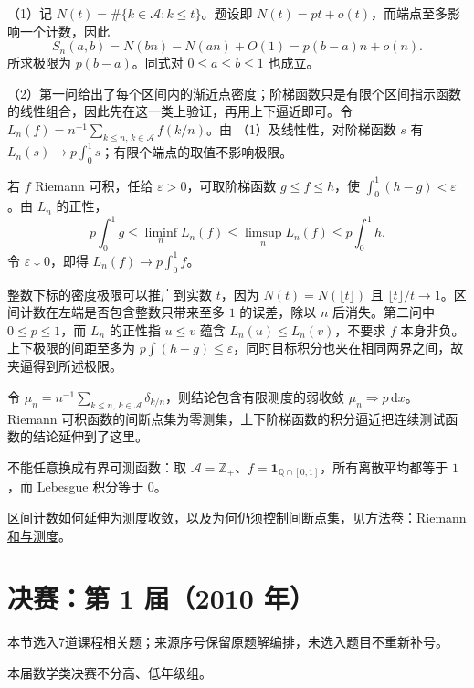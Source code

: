 \documentclass[12pt,fontset=fandol]{ctexart}
\begin{document}
\begin{solve}\label{ans:ch01-17th-A:6}

（1）记 $N(t)=\#\{k\in\mathcal A:k\leq t\}$。题设即 $N(t)=pt+o(t)$，而端点至多影响一个计数，因此
\[
S_n(a,b)=N(bn)-N(an)+O(1)=p(b-a)n+o(n).
\]
所求极限为 $p(b-a)$。同式对 $0\leq a\leq b\leq1$ 也成立。

（2）第一问给出了每个区间内的渐近点密度；阶梯函数只是有限个区间指示函数的线性组合，因此先在这一类上验证，再用上下逼近即可。令 $L_n(f)=n^{-1}\sum_{k\leq n,\,k\in\mathcal A}f(k/n)$。由 （1）及线性性，对阶梯函数 $s$ 有 $L_n(s)\to p\int_0^1s$；有限个端点的取值不影响极限。

若 $f$ Riemann 可积，任给 $\varepsilon>0$，可取阶梯函数 $g\leq f\leq h$，使 $\int_0^1(h-g)<\varepsilon$。由 $L_n$ 的正性，
\[
p\int_0^1g\leq\liminf_nL_n(f)
\leq\limsup_nL_n(f)\leq p\int_0^1h.
\]
令 $\varepsilon\downarrow0$，即得 $L_n(f)\to p\int_0^1f$。

整数下标的密度极限可以推广到实数 $t$，因为 $N(t)=N(\lfloor t\rfloor)$ 且 $\lfloor t\rfloor/t\to1$。区间计数在左端是否包含整数只带来至多 $1$ 的误差，除以 $n$ 后消失。第二问中 $0\le p\le1$，而 $L_n$ 的正性指 $u\le v$ 蕴含 $L_n(u)\le L_n(v)$，不要求 $f$ 本身非负。上下极限的间距至多为 $p\int(h-g)\le\varepsilon$，同时目标积分也夹在相同两界之间，故夹逼得到所述极限。

\end{solve}

\begin{remark}[方法与条件]令 $\mu_n=n^{-1}\sum_{k\leq n,\,k\in\mathcal A}\delta_{k/n}$，则结论包含有限测度的弱收敛 $\mu_n\Rightarrow p\,\mathrm dx$。Riemann 可积函数的间断点集为零测集，上下阶梯函数的积分逼近把连续测试函数的结论延伸到了这里。

不能任意换成有界可测函数：取 $\mathcal A=\mathbb Z_+$、$f=\mathbf1_{\mathbb Q\cap[0,1]}$，所有离散平均都等于 $1$，而 Lebesgue 积分等于 $0$。

区间计数如何延伸为测度收敛，以及为何仍须控制间断点集，见\hyperref[app:integration-riemann]{方法卷：Riemann 和与测度}。\end{remark}

\section{决赛：第 1 届（2010 年）}

本节选入7道课程相关题；来源序号保留原题解编排，未选入题目不重新补号。

\begin{remark}[来源说明]本届数学类决赛不分高、低年级组。\end{remark}
\end{document}
